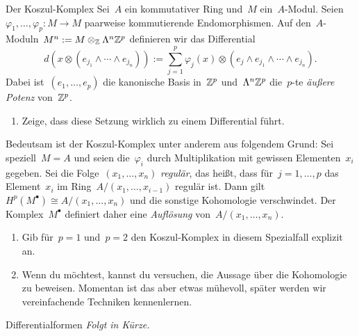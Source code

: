 \documentclass{uebblatt}
\begin{document}
\begin{aufgabe}{Der Koszul-Komplex}
Sei~$A$ ein kommutativer Ring und~$M$ ein~$A$-Modul.
Seien~$\varphi_1,\ldots,\varphi_p : M \to M$ paarweise kommutierende
Endomorphismen. Auf den~$A$-Moduln~$M^n := M \otimes_{\mathbb{Z}} \Lambda^n \mathbb{Z}^p$
definieren wir das Differential
\[ d(x \otimes (e_{j_1} \wedge \cdots \wedge e_{j_n})) :=
  \sum_{j=1}^p \varphi_j(x) \otimes (e_j \wedge e_{j_1} \wedge \cdots \wedge
  e_{j_n}). \]
Dabei ist~$(e_1,\ldots,e_p)$ die kanonische Basis in~$\mathbb{Z}^p$ und~$\Lambda^n
\mathbb{Z}^p$ die~$p$-te \emph{äußere Potenz} von~$\mathbb{Z}^p$.
\begin{enumerate}
\item Zeige, dass diese Setzung wirklich zu einem Differential führt.
\end{enumerate}
Bedeutsam ist der Koszul-Komplex unter anderem aus folgendem Grund:
Sei speziell~$M = A$ und seien die~$\varphi_i$ durch Multiplikation mit
gewissen Elementen~$x_i$ gegeben. Sei die Folge~$(x_1,\ldots,x_n)$
\emph{regulär}, das heißt, dass für~$j = 1,\ldots,p$ das Element~$x_i$ im
Ring~$A/(x_1,\ldots,x_{i-1})$ regulär ist. Dann gilt~$H^p(M^\bullet) \cong
A/(x_1,\ldots,x_n)$ und die sonstige Kohomologie verschwindet. Der
Komplex~$M^\bullet$ definiert daher eine \emph{Auflösung}
von~$A/(x_1,\ldots,x_n)$.
\begin{enumerate}
\addtocounter{enumi}{1}
\item Gib für~$p = 1$ und~$p= 2$ den Koszul-Komplex in diesem Spezialfall
explizit an.
\item Wenn du möchtest, kannst du versuchen, die Aussage über die Kohomologie
zu beweisen. Momentan ist das aber etwas mühevoll, später werden wir
vereinfachende Techniken kennenlernen.
\end{enumerate}
\end{aufgabe}

\begin{aufgabe}{Differentialformen}
\emph{Folgt in Kürze.}
\end{aufgabe}
\end{document}
